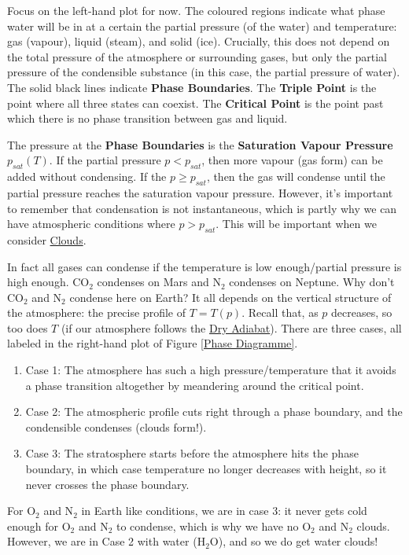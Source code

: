 Focus on the left-hand plot for now. The coloured regions indicate what phase water will be in at a certain the partial pressure (of the water) and temperature: gas (vapour), liquid (steam), and solid (ice). Crucially, this does not depend on the total pressure of the atmosphere or surrounding gases, but only the partial pressure of the condensible substance (in this case, the partial pressure of water). The solid black lines indicate \textbf{Phase Boundaries}. The \textbf{Triple Point} is the point where all three states can coexist. The \textbf{Critical Point} is the point past which there is no phase transition between gas and liquid.

The pressure at the \textbf{Phase Boundaries} is the \textbf{Saturation Vapour Pressure} \(p_{sat}(T)\). If the partial pressure \(p<p_{sat}\), then more vapour (gas form) can be added without condensing. If the \(p\geq p_{sat}\), then the gas will condense until the partial pressure reaches the saturation vapour pressure. However, it's important to remember that condensation is not instantaneous, which is partly why we can have atmospheric conditions where \(p>p_{sat}\). This will be important when we consider \hyperref[Clouds]{Clouds}.

In fact all gases can condense if the temperature is low enough/partial pressure is high enough. CO\(_2\) condenses on Mars and N\(_2\) condenses on Neptune. Why don't CO\(_2\) and N\(_2\) condense here on Earth? It all depends on the vertical structure of the atmosphere: the precise profile of \(T=T(p)\). Recall that, as \(p\) decreases, so too does \(T\) (if our atmosphere follows the \hyperref[Dry Adiabat]{Dry Adiabat}). There are three cases, all labeled in the right-hand plot of Figure \ref{Phase Diagramme}.

\begin{enumerate}
    \item Case 1: The atmosphere has such a high pressure/temperature that it avoids a phase transition altogether by meandering around the critical point.
    \item Case 2: The atmospheric profile cuts right through a phase boundary, and the condensible condenses (clouds form!).
    \item Case 3: The stratosphere starts before the atmosphere hits the phase boundary, in which case temperature no longer decreases with height, so it never crosses the phase boundary.
\end{enumerate}

For O\(_2\) and N\(_2\) in Earth like conditions, we are in case 3: it never gets cold enough for O\(_2\) and N\(_2\) to condense, which is why we have no O\(_2\) and N\(_2\) clouds. However, we are in Case 2 with water (H\(_2\)O), and so we do get water clouds!


